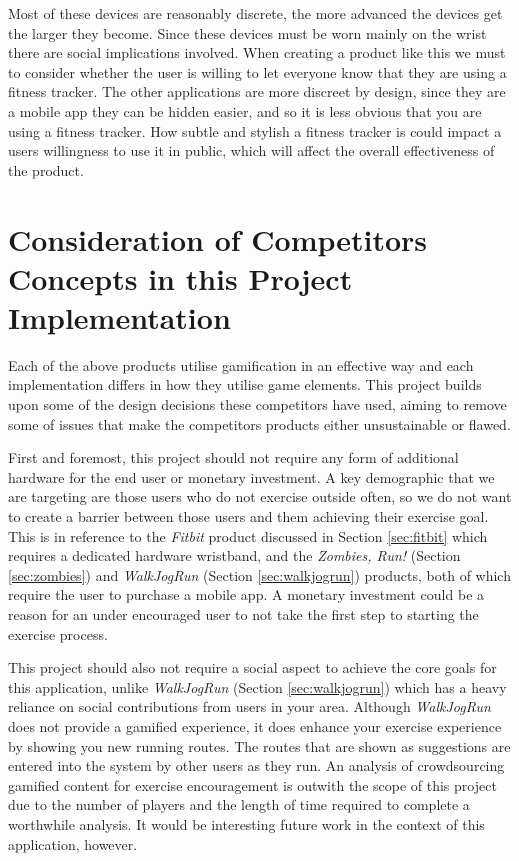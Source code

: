 Most of these devices are reasonably discrete, the more advanced the
devices get the larger they become. Since these devices must be worn
mainly on the wrist there are social implications involved. When
creating a product like this we must to consider whether the user
is willing to let everyone know that they are using a fitness tracker.
The other applications are more discreet by design, since they are a
mobile app they can be hidden easier, and so it is less obvious that
you are using a fitness tracker. How subtle and stylish a fitness
tracker is could impact a users willingness to use it in public, which
will affect the overall effectiveness of the product.

\section{Consideration of Competitors Concepts in this Project
  Implementation}
\label{sec:consideration}
Each of the above products utilise gamification in an effective way
and each implementation differs in how they utilise game
elements. This project builds upon some of the design decisions these
competitors have used, aiming to remove some of issues that make the
competitors products either unsustainable or flawed.

First and foremost, this project should not require any form of
additional hardware for the end user or monetary investment. A key
demographic that we are targeting are those users who do not exercise
outside often, so we do not want to create a barrier between those
users and them achieving their exercise goal. This is in reference to
the \emph{Fitbit} product discussed in Section \ref{sec:fitbit} which
requires a dedicated hardware wristband, and the \emph{Zombies, Run!}
(Section \ref{sec:zombies}) and \emph{WalkJogRun} (Section
\ref{sec:walkjogrun}) products, both of which require the user to
purchase a mobile app. A monetary investment could be a reason for an
under encouraged user to not take the first step to starting the
exercise process. 

This project should also not require a social aspect to achieve the
core goals for this application, unlike \emph{WalkJogRun} (Section
\ref{sec:walkjogrun}) which has a heavy reliance on social
contributions from users in your area. Although \emph{WalkJogRun} does not
provide a gamified experience, it does enhance your exercise
experience by showing you new running routes. The routes that are
shown as suggestions are entered into the system by other users as
they run. An analysis of crowdsourcing gamified content for exercise
encouragement is outwith the scope of this project due to the number
of players and the length of time required to complete a worthwhile
analysis. It would be interesting future work in the context of this
application, however. 

